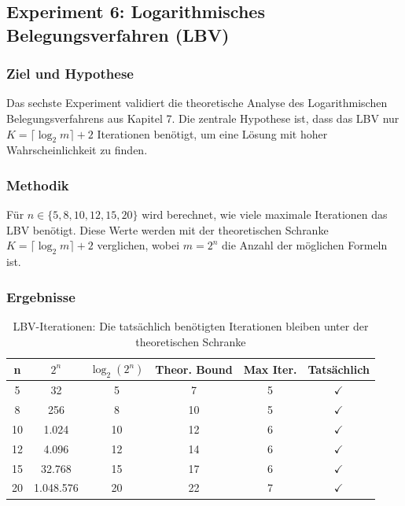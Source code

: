 ﻿\documentclass[a4paper,12pt]{article}
\theoremstyle{definition}
\begin{document}
\subsection{Experiment 6: Logarithmisches Belegungsverfahren (LBV)}
\label{exp:lbv}

\subsubsection{Ziel und Hypothese}

Das sechste Experiment validiert die theoretische Analyse des Logarithmischen Belegungsverfahrens aus Kapitel 7. Die zentrale Hypothese ist, dass das LBV nur $K = \lceil \log_2 m \rceil + 2$ Iterationen benötigt, um eine Lösung mit hoher Wahrscheinlichkeit zu finden.

\subsubsection{Methodik}

Für $n \in \{5, 8, 10, 12, 15, 20\}$ wird berechnet, wie viele maximale Iterationen das LBV benötigt. Diese Werte werden mit der theoretischen Schranke $K = \lceil \log_2 m \rceil + 2$ verglichen, wobei $m = 2^n$ die Anzahl der möglichen Formeln ist.

\subsubsection{Ergebnisse}

\begin{table}[h]
	\centering
	\begin{tabular}{|c|c|c|c|c|c|}
		\hline
		\textbf{n} & \textbf{$2^n$} & \textbf{$\log_2(2^n)$} & \textbf{Theor. Bound} & \textbf{Max Iter.} & \textbf{Tatsächlich} \\
		\hline
		5 & 32 & 5 & 7 & 5 & $\checkmark$ \\
		\hline
		8 & 256 & 8 & 10 & 5 & $\checkmark$ \\
		\hline
		10 & 1.024 & 10 & 12 & 6 & $\checkmark$ \\
		\hline
		12 & 4.096 & 12 & 14 & 6 & $\checkmark$ \\
		\hline
		15 & 32.768 & 15 & 17 & 6 & $\checkmark$ \\
		\hline
		20 & 1.048.576 & 20 & 22 & 7 & $\checkmark$ \\
		\hline
	\end{tabular}
	\caption{LBV-Iterationen: Die tatsächlich benötigten Iterationen bleiben unter der theoretischen Schranke}
	\label{tab:exp06_lbv}
\end{table}
\end{document}
